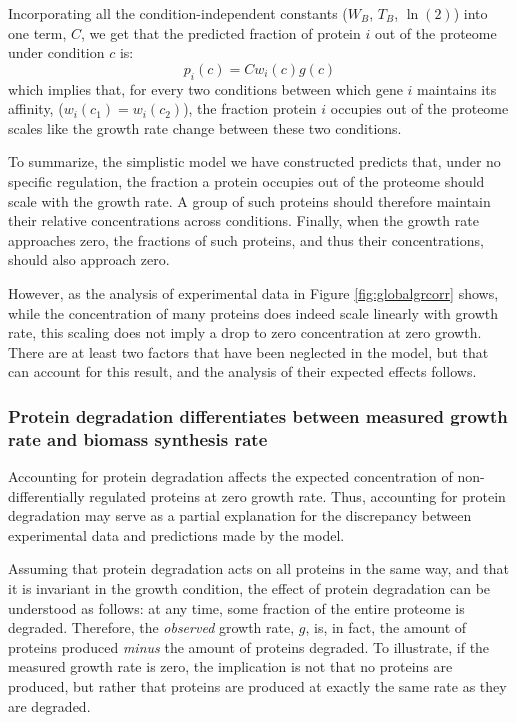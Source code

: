 \documentclass[notitlepage]{article}
\begin{document}
Incorporating all the condition-independent constants ($W_B$, $T_B$, $\ln(2)$) into one term, $C$, we get that the predicted fraction of protein $i$ out of the proteome under condition $c$ is:
\begin{equation}
  \label{eq:final-conc}
  p_i(c)=Cw_i(c)g(c)
\end{equation}
which implies that, for every two conditions between which gene $i$ maintains its affinity, ($w_i(c_1)=w_i(c_2)$), the fraction protein $i$ occupies out of the proteome scales like the growth rate change between these two conditions.

To summarize, the simplistic model we have constructed predicts that, under no specific regulation, the fraction a protein occupies out of the proteome should scale with the growth rate.
A group of such proteins should therefore maintain their relative concentrations across conditions.
Finally, when the growth rate approaches zero, the fractions of such proteins, and thus their concentrations, should also approach zero.

However, as the analysis of experimental data in Figure \ref{fig:globalgrcorr} shows, while the concentration of many proteins does indeed scale linearly with growth rate, this scaling does not imply a drop to zero concentration at zero growth.
There are at least two factors that have been neglected in the model, but that can account for this result, and the analysis of their expected effects follows.

\subsubsection{Protein degradation differentiates between measured growth rate and biomass synthesis rate}
Accounting for protein degradation affects the expected concentration of non-differentially regulated proteins at zero growth rate.
Thus, accounting for protein degradation may serve as a partial explanation for the discrepancy between experimental data and predictions made by the model.

Assuming that protein degradation acts on all proteins in the same way, and that it is invariant in the growth condition, the effect of protein degradation can be understood as follows: at any time, some fraction of the entire proteome is degraded.
Therefore, the \emph{observed} growth rate, $g$, is, in fact, the amount of proteins produced \emph{minus} the amount of proteins degraded.
To illustrate, if the measured growth rate is zero, the implication is not that no proteins are produced, but rather that proteins are produced at exactly the same rate as they are degraded.
\end{document}
